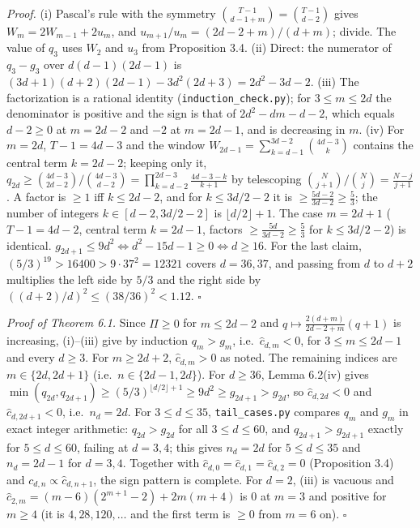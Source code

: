 \documentclass[
  11pt,
  a4paper,
]{article}
\begin{document}
\emph{Proof.} (i) Pascal's rule with the symmetry
\(\binom{T-1}{d-1+m}=\binom{T-1}{d-2}\) gives \(W_m=2W_{m-1}+2u_m\), and
\(u_{m+1}/u_m=(2d-2+m)/(d+m)\); divide. The value of \(q_3\) uses
\(W_2\) and \(u_3\) from Proposition 3.4. (ii) Direct: the numerator of
\(q_3-g_3\) over \(d(d-1)(2d-1)\) is
\((3d+1)(d+2)(2d-1)-3d^2(2d+3)=2d^2-3d-2\). (iii) The factorization is a
rational identity ({\small\texttt{induction\_\allowbreak{}check.\allowbreak{}py}}); for \(3\le m\le2d\)
the denominator is positive and the sign is that of \(2d^2-dm-d-2\),
which equals \(d-2\ge0\) at \(m=2d-2\) and \(-2\) at \(m=2d-1\), and is
decreasing in \(m\). (iv) For \(m=2d\), \(T-1=4d-3\) and the window
\(W_{2d-1}=\sum_{k=d-1}^{3d-2}\binom{4d-3}{k}\) contains the central
term \(k=2d-2\); keeping only it,
\(q_{2d}\ge\binom{4d-3}{2d-2}/\binom{4d-3}{d-2}=\prod_{k=d-2}^{2d-3}\frac{4d-3-k}{k+1}\)
by telescoping \(\binom{N}{j+1}/\binom{N}{j}=\frac{N-j}{j+1}\). A factor
is \(\ge1\) iff \(k\le2d-2\), and for \(k\le3d/2-2\) it is
\(\ge\frac{5d-2}{3d-2}\ge\frac53\); the number of integers
\(k\in[d-2,\allowbreak{}3d/2-2]\) is \(\lfloor d/2\rfloor+1\). The case \(m=2d+1\)
(\(T-1=4d-2\), central term \(k=2d-1\), factors
\(\ge\frac{5d}{3d-2}\ge\frac53\) for \(k\le3d/2-2\)) is identical.
\(g_{2d+1}\le9d^2\iff d^2-15d-1\ge0\iff d\ge16\). For the last claim,
\((5/3)^{19}>16400>9\cdot37^2=12321\) covers \(d=36,\allowbreak{}37\), and passing
from \(d\) to \(d+2\) multiplies the left side by \(5/3\) and the right
side by \(((d+2)/d)^2\le(38/36)^2<1.12\). \(\square\)

\emph{Proof of Theorem 6.1.} Since \(\Pi\ge0\) for \(m\le2d-2\) and
\(q\mapsto\frac{2(d+m)}{2d-2+m}(q+1)\) is increasing, (i)--(iii) give by
induction \(q_m>g_m\), i.e.~\(\hat c_{d,\allowbreak{}m}<0\), for \(3\le m\le2d-1\)
and every \(d\ge3\). For \(m\ge2d+2\), \(\hat c_{d,\allowbreak{}m}>0\) as noted. The
remaining indices are \(m\in\{2d,\allowbreak{}2d+1\}\) (i.e.~\(n\in\{2d-1,\allowbreak{}2d\}\)).
For \(d\ge36\), Lemma 6.2(iv) gives
\(\min(q_{2d},\allowbreak{}q_{2d+1})\ge(5/3)^{\lfloor d/2\rfloor+1}\ge9d^2\ge g_{2d+1}>g_{2d}\),
so \(\hat c_{d,\allowbreak{}2d}<0\) and \(\hat c_{d,\allowbreak{}2d+1}<0\), i.e.~\(n_d=2d\). For
\(3\le d\le35\), {\small\texttt{tail\_\allowbreak{}cases.\allowbreak{}py}} compares \(q_m\) and \(g_m\) in
exact integer arithmetic: \(q_{2d}>g_{2d}\) for all \(3\le d\le60\), and
\(q_{2d+1}>g_{2d+1}\) exactly for \(5\le d\le60\), failing at \(d=3,\allowbreak{}4\);
this gives \(n_d=2d\) for \(5\le d\le35\) and \(n_d=2d-1\) for
\(d=3,\allowbreak{}4\). Together with \(\hat c_{d,\allowbreak{}0}=\hat c_{d,\allowbreak{}1}=\hat c_{d,\allowbreak{}2}=0\)
(Proposition 3.4) and \(c_{d,\allowbreak{}n}\propto\hat c_{d,\allowbreak{}n+1}\), the sign pattern
is complete. For \(d=2\), (iii) is vacuous and
\(\hat c_{2,\allowbreak{}m}=(m-6)(2^{m+1}-2)+2m(m+4)\) is \(0\) at \(m=3\) and
positive for \(m\ge4\) (it is \(4,\allowbreak{}28,\allowbreak{}120,\allowbreak{}\dots\) and the first term is
\(\ge0\) from \(m=6\) on). \(\square\)
\end{document}
